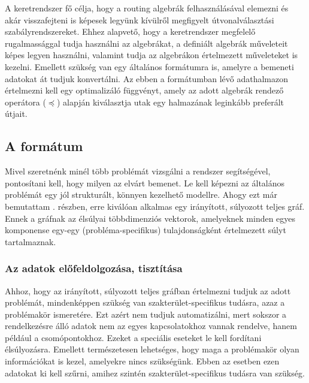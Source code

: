   A keretrendszer fő célja, hogy a routing algebrák felhasználásával elemezni és akár visszafejteni is képesek legyünk kívülről megfigyelt útvonalválasztási szabályrendszereket. Ehhez alapvető, hogy a keretrendszer megfelelő rugalmassággal tudja használni az algebrákat, a definiált algebrák műveleteit képes legyen használni, valamint tudja az algebrákon értelmezett műveleteket is kezelni. Emellett szükség van egy általános formátumra is, amelyre a bemeneti adatokat át tudjuk konvertálni. Az ebben a formátumban lévő adathalmazon értelmezni kell egy optimalizáló függvényt, amely az adott algebrák rendező operátora ($\preceq$) alapján kiválasztja utak egy halmazának leginkább preferált útjait.

    \subsection{A formátum}
    Mivel szeretnénk minél több problémát vizsgálni a rendszer segítségével, pontosítani kell, hogy milyen az elvárt bemenet. Le kell képezni az általános problémát egy jól strukturált, könnyen kezelhető modellre. Ahogy ezt már bemutattam . részben, erre kiválóan alkalmas egy irányított, súlyozott teljes gráf. Ennek a gráfnak az élsúlyai többdimenziós vektorok, amelyeknek minden egyes komponense egy-egy (probléma-specifikus) tulajdonságként értelmezett súlyt tartalmaznak.

      \subsubsection{Az adatok előfeldolgozása, tisztítása}\label{prep}
      Ahhoz, hogy az irányított, súlyozott teljes gráfban értelmezni tudjuk az adott problémát, mindenképpen szükség van szakterület-specifikus tudásra, azaz a problémakör ismeretére. Ezt azért nem tudjuk automatizálni, mert sokszor a rendelkezésre álló adatok nem az egyes kapcsolatokhoz vannak rendelve, hanem például a csomópontokhoz. Ezeket a speciális eseteket le kell fordítani élsúlyozásra. Emellett természetesen lehetséges, hogy maga a problémakör olyan információkat is kezel, amelyekre nincs szükségünk. Ebben az esetben ezen adatokat ki kell szűrni, amihez szintén szakterület-specifikus tudásra van szükség.\\

